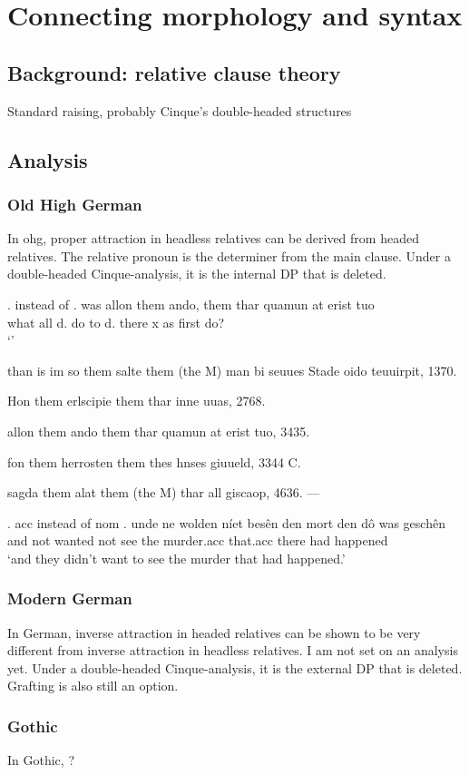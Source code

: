 
\chapter{Connecting morphology and syntax}\label{ch:connecting}


\section{Background: relative clause theory}
Standard raising, probably Cinque's double-headed structures

\section{Analysis}

\subsection{Old High German}
In \ac{ohg}, proper attraction in headless relatives can be derived from headed relatives. The relative pronoun is the determiner from the main clause. Under a double-headed Cinque-analysis, it is the internal DP that is deleted.


\ex.  instead of 
\ag. was allon them ando, them thar quamun at erist tuo\\
 what all d. {do to} d. there x as first do?\\
 `'



than is im so them salte them (the M) man bi seuues Stade
oido teuuirpit, 1370.

Hon them erlscipie them thar inne uuas, 2768.

allon them ando them thar quamun at erist tuo, 3435. 

fon them herrosten them thes hnses giuueld, 3344 C.

sagda them alat them (the M) thar all giscaop, 4636. —



\ex. \ac{acc} instead of \ac{nom}
\ag. unde ne wolden níet besên den mort den dô was geschên\\
 and not wanted not see the murder.\ac{acc} that.\ac{acc} there had happened\\
 `and they didn't want to see the murder that had happened.' 



\subsection{Modern German}
In German, inverse attraction in headed relatives can be shown to be very different from inverse attraction in headless relatives. I am not set on an analysis yet. Under a double-headed Cinque-analysis, it is the external DP that is deleted. Grafting is also still an option.


\subsection{Gothic}
In Gothic, ?
